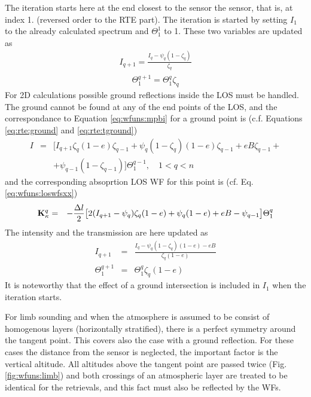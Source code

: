  The iteration starts here at the end closest to the sensor the
 sensor, that is, at index 1. (reversed order to the RTE part).  The
 iteration is started by setting $I_1$ to the already calculated
 spectrum and $\Theta^1_1$ to 1.  These two variables are updated as
 \begin{eqnarray}
   I_{q+1} = \frac{I_q - \psi_q(1-\zeta_q)}{\zeta_q} 
 \end{eqnarray}
 \begin{eqnarray}
   \Theta_1^{q+1} =  \Theta_1^q \zeta_q
 \end{eqnarray}
 For 2D calculations possible ground reflections inside the LOS must
 be handled. The ground cannot be found at any of the end points of
 the LOS, and the correspondance to Equation \ref{eq:wfuns:mpbi} for a
 ground point is (c.f. Equations \ref{eq:rte:ground} and
 \ref{eq:rte:tground})
 \begin{eqnarray}
   I &=&\Big[I_{q+1}\zeta_q(1-e)\zeta_{q-1}+\psi_q(1-\zeta_q)(1-e)\zeta_{q-1}
          +eB\zeta_{q-1}+ \nonumber \\
     & & + \psi_{q-1}(1-\zeta_{q-1}) \Big] \Theta^{q-1}_1, \quad 1<q<n 
    \label{eq:wfuns:mpbi_ground}
 \end{eqnarray}
 and the corresponding absoprtion LOS WF for this point is (cf. Eq.
 \ref{eq:wfuns:loswfsxx})
 \begin{eqnarray}
   \mathbf{K}_{\kappa}^q &=& -\frac{\Delta l}{2} \big[ 2(I_{q+1}-\psi_q)\zeta_q(1-e)+
           \psi_q(1-e)+eB-\psi_{q-1} \big] \Theta^q_1 \\
 \end{eqnarray}
 The intensity and the transmission are here updated as
 \begin{eqnarray}
   I_{q+1} &=& \frac{I_q-\psi_q(1-\zeta_q)(1-e)-eB}{\zeta_q(1-e)}  \nonumber \\
   \Theta_1^{q+1} &=& \Theta_1^{q}\zeta_q(1-e) \nonumber
 \end{eqnarray}
 It is noteworthy that the effect of a ground intersection is included
 in $I_1$ when the iteration starts.  




 
 \label{sec:wfuns:limb}
    
 For limb sounding and when the atmosphere is assumed to be consist of
 homogenous layers (horizontally stratified), there is a perfect
 symmetry around the tangent point. This covers also the case with a
 ground reflection. For these cases the distance from the sensor is
 neglected, the important factor is the vertical altitude.  All
 altitudes above the tangent point are passed twice (Fig.
 \ref{fig:wfuns:limb}) and both crossings of an atmospheric layer are
 treated to be identical for the retrievals, and this fact must also
 be reflected by the WFs.

